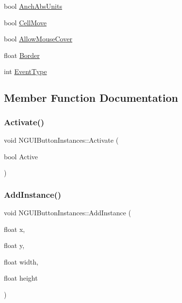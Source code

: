 \begin{DoxyCompactItemize}
\item 
bool \hyperlink{class_n_g_u_i_button_instances_a9ec200c657da0cfa4bbba490bb40d6ad}{Anch\+Abs\+Units}
\item 
bool \hyperlink{class_n_g_u_i_button_instances_ac8810d3675c727c8655ca7024c7b0d26}{Cell\+Move}
\item 
bool \hyperlink{class_n_g_u_i_button_instances_aca7ee7182098c0f14365715e670292e4}{Allow\+Mouse\+Cover}
\item 
float \hyperlink{class_n_g_u_i_button_instances_ac304037f6abf38edad843c23d63e3bdc}{Border}
\item 
int \hyperlink{class_n_g_u_i_button_instances_ae43cfa8cf447159ab22371d30ef552e0}{Event\+Type}
\end{DoxyCompactItemize}


\subsection{Member Function Documentation}
\hypertarget{class_n_g_u_i_button_instances_a5dcb1fe9f38f1efa2418cca59250cbf0}{}\label{class_n_g_u_i_button_instances_a5dcb1fe9f38f1efa2418cca59250cbf0} 
\subsubsection{\texorpdfstring{Activate()}{Activate()}}
{\footnotesize\ttfamily void N\+G\+U\+I\+Button\+Instances\+::\+Activate (\begin{DoxyParamCaption}\item[{bool}]{Active }\end{DoxyParamCaption})}

\hypertarget{class_n_g_u_i_button_instances_a3dfa4938220575aac4a954de6803543e}{}\label{class_n_g_u_i_button_instances_a3dfa4938220575aac4a954de6803543e} 
\subsubsection{\texorpdfstring{Add\+Instance()}{AddInstance()}}
{\footnotesize\ttfamily void N\+G\+U\+I\+Button\+Instances\+::\+Add\+Instance (\begin{DoxyParamCaption}\item[{float}]{x,  }\item[{float}]{y,  }\item[{float}]{width,  }\item[{float}]{height }\end{DoxyParamCaption})}

